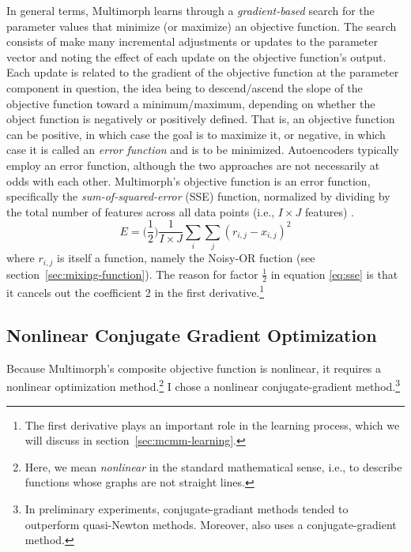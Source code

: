 In general terms, Multimorph learns through a \emph{gradient-based} 
search for the parameter values that minimize (or maximize) an objective function. The search consists of make many  incremental adjustments or updates to the parameter vector and noting the effect of each update on the objective function's output. Each update is related to the gradient 
of the objective function at the parameter component in question, the idea being to descend/ascend 
the slope of the objective function toward a minimum/maximum, depending 
on whether the object function is negatively or positively defined. 
That is, an objective function can be positive, in which case the goal is to maximize it, 
or negative, in which case it is
called an \emph{error function} and is to be minimized. Autoencoders typically 
employ an error function, although the two approaches are not necessarily at odds 
with each other. 
Multimorph's objective function is an error function, specifically the \emph{sum-of-squared-error} (SSE)  function, normalized 
by dividing by the total number of features across
all data points (i.e., $I \times J$ features) \citep{somandepalli:2018}.
\begin{equation} \label{eq:sse}
E = \bigg(\frac{1}{2}\bigg) \frac{1}{I \times J}\sum_{i} \sum_{j} {(r_{i,j} - x_{i,j})}^2
\end{equation}
where $r_{i,j}$ is itself a function, namely the Noisy-OR fuction (see section~\ref{sec:mixing-function}). The reason for factor $\frac{1}{2}$ in equation \eqref{eq:sse} is that it cancels out the coefficient 2 in the first derivative.\footnote{The first derivative plays an important role in the learning process, which we will discuss in section~\ref{sec:mcmm-learning}.}

\subsection{Nonlinear Conjugate Gradient Optimization}
\label{sec:ncg-gen}
Because Multimorph's composite objective function is nonlinear, it requires a nonlinear optimization method.\footnote{Here, we mean \emph{nonlinear} in the standard mathematical sense, i.e., to describe functions whose graphs are not straight lines.} I chose a nonlinear conjugate-gradient method.\footnote{In preliminary experiments, conjugate-gradiant methods tended to outperform quasi-Newton methods. Moreover, \citet{saund:94} also uses a conjugate-gradient method.} 

